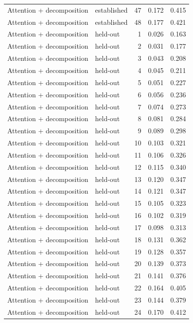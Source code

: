 \begin{tabular}{llrrr}
Attention + decomposition & established & 47 & 0.172 & 0.415 \\
Attention + decomposition & established & 48 & 0.177 & 0.421 \\
Attention + decomposition & held-out & 1 & 0.026 & 0.163 \\
Attention + decomposition & held-out & 2 & 0.031 & 0.177 \\
Attention + decomposition & held-out & 3 & 0.043 & 0.208 \\
Attention + decomposition & held-out & 4 & 0.045 & 0.211 \\
Attention + decomposition & held-out & 5 & 0.051 & 0.227 \\
Attention + decomposition & held-out & 6 & 0.056 & 0.236 \\
Attention + decomposition & held-out & 7 & 0.074 & 0.273 \\
Attention + decomposition & held-out & 8 & 0.081 & 0.284 \\
Attention + decomposition & held-out & 9 & 0.089 & 0.298 \\
Attention + decomposition & held-out & 10 & 0.103 & 0.321 \\
Attention + decomposition & held-out & 11 & 0.106 & 0.326 \\
Attention + decomposition & held-out & 12 & 0.115 & 0.340 \\
Attention + decomposition & held-out & 13 & 0.120 & 0.347 \\
Attention + decomposition & held-out & 14 & 0.121 & 0.347 \\
Attention + decomposition & held-out & 15 & 0.105 & 0.323 \\
Attention + decomposition & held-out & 16 & 0.102 & 0.319 \\
Attention + decomposition & held-out & 17 & 0.098 & 0.313 \\
Attention + decomposition & held-out & 18 & 0.131 & 0.362 \\
Attention + decomposition & held-out & 19 & 0.128 & 0.357 \\
Attention + decomposition & held-out & 20 & 0.139 & 0.373 \\
Attention + decomposition & held-out & 21 & 0.141 & 0.376 \\
Attention + decomposition & held-out & 22 & 0.164 & 0.405 \\
Attention + decomposition & held-out & 23 & 0.144 & 0.379 \\
Attention + decomposition & held-out & 24 & 0.170 & 0.412 \\

\end{tabular}
